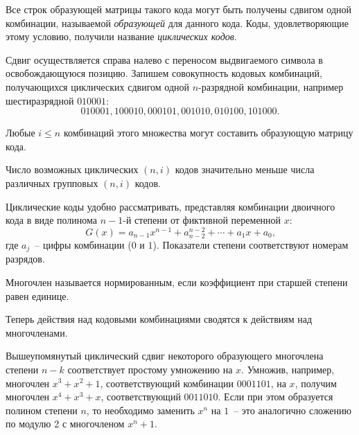 \documentclass[12pt,a4paper]{article}
\begin{document}
  Все строк образующей матрицы такого кода могут быть получены сдвигом одной комбинации, называемой \textit{образующей} для данного кода. Коды, удовлетворяющие этому условию, получили название \emph{циклических кодов}.
  
  Сдвиг осуществляется справа налево с переносом выдвигаемого символа в освобождающуюся позицию. Запишем совокупность кодовых комбинаций, получающихся циклических сдвигом одной $n$-разрядной комбинации, например шестиразрядной $010001$:
  \begin{equation}
    \nonumber
    010001, 100010, 000101, 001010, 010100, 101000.
  \end{equation}
  
  Любые $i\leq n$ комбинаций этого множества могут составить образующую матрицу кода.
  
  Число возможных циклических $(n,i)$ кодов значительно меньше числа различных групповых $(n,i)$ кодов.
    
  Циклические коды удобно рассматривать, представляя комбинации двоичного кода в виде полинома $n-1$-й степени от фиктивной переменной $x$:
  \begin{equation}
    \nonumber
    G(x)=a_{n-1}x^{n-1}+a_{n-2}^{n-2}+\cdots +a_1x+a_0\text{,}
  \end{equation}
  где $a_j$~-- цифры комбинации ($0$ и $1$). Показатели степени соответствуют номерам разрядов. 
  
  Многочлен называется нормированным, если коэффициент при старшей степени равен единице.
  
  Теперь действия над кодовыми комбинациями сводятся к действиям над многочленами.
  
  Вышеупомянутый циклический сдвиг некоторого образующего многочлена степени $n-k$ соответствует простому умножению на $x$. Умножив, например, многочлен $x^3+x^2+1$, соответствующий комбинации $0001101$, на $x$, получим многочлен $x^4+x^3+x$, соответствующий $0011010$. Если при этом образуется полином степени $n$, то необходимо заменить $x^n$ на $1$~-- это аналогично сложению по модулю 2 с многочленом $x^n+1$.
  
\end{document}
